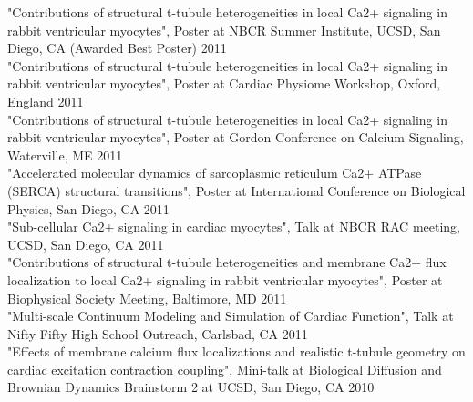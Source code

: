 "Contributions of structural t-tubule heterogeneities in local Ca2+ signaling in rabbit ventricular myocytes", Poster at NBCR Summer Institute, UCSD, San Diego, CA (Awarded Best Poster) \hfill 2011 \\

"Contributions of structural t-tubule heterogeneities in local Ca2+ signaling  in rabbit ventricular myocytes", Poster at Cardiac Physiome Workshop, Oxford, England \hfill 2011 \\

"Contributions of structural t-tubule heterogeneities in local Ca2+ signaling in rabbit ventricular myocytes", Poster at Gordon Conference on Calcium Signaling, Waterville, ME \hfill 2011 \\

"Accelerated molecular dynamics of sarcoplasmic reticulum  Ca2+ ATPase (SERCA) structural transitions", Poster at International Conference on Biological Physics, San Diego, CA \hfill 2011 \\

"Sub-cellular Ca2+ signaling in cardiac myocytes", Talk at NBCR RAC meeting, UCSD, San Diego, CA \hfill 2011 \\

"Contributions of structural t-tubule heterogeneities and membrane Ca2+ flux localization to local Ca2+ signaling in rabbit ventricular myocytes", Poster at Biophysical Society Meeting, Baltimore, MD  \hfill 2011 \\

"Multi-scale Continuum Modeling and Simulation of Cardiac Function", Talk at Nifty Fifty High School Outreach, Carlsbad, CA \hfill 2011 \\

"Effects of membrane calcium flux localizations and realistic t-tubule geometry on cardiac excitation contraction coupling", Mini-talk at Biological Diffusion and Brownian Dynamics Brainstorm 2 at UCSD, San Diego, CA \hfill 2010 \\

